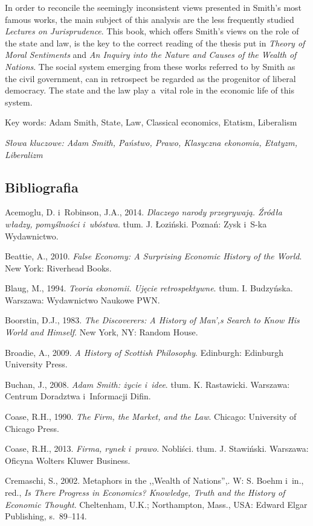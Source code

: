 In order to reconcile the seemingly inconsistent views presented in Smith's most famous works, the main subject of this analysis are the less frequently studied \textit{Lectures on Jurisprudence}. This book, which offers Smith's views on the role of the state and law, is the key to the correct reading of the thesis put in \textit{Theory of Moral Sentiments} and \textit{An Inquiry into the Nature and Causes of the Wealth of Nations}. The social system emerging from these works referred to by Smith as the civil government, can in retrospect be regarded as the progenitor of liberal democracy. The state and the law play a~vital role in the economic life of this system.

Key words: Adam Smith, State, Law, Classical economics, Etatism, Liberalism

{\itshape
Słowa kluczowe: Adam Smith, Państwo, Prawo, Klasyczna ekonomia, Etatyzm, Liberalizm}

\subsection{Bibliografia}

Acemoglu, D. i~Robinson, J.A., 2014. \textit{Dlaczego narody przegrywają. Źródła władzy, pomyślności i~ubóstwa}. tłum. J. Łoziński. Poznań: Zysk i~S-ka Wydawnictwo.

Beattie, A., 2010. \textit{False Economy: A Surprising Economic History of the World}. New York: Riverhead Books.

Blaug, M., 1994. \textit{Teoria ekonomii. Ujęcie retrospektywne}. tłum. I. Budzyńska. Warszawa: Wydawnictwo Naukowe PWN.

Boorstin, D.J., 1983. \textit{The Discoverers: A History of Man',s Search to Know His World and Himself}. New York, NY: Random House.

Broadie, A., 2009. \textit{A History of Scottish Philosophy}. Edinburgh: Edinburgh University Press.

Buchan, J., 2008. \textit{Adam Smith: życie i~idee}. tłum. K. Rastawicki. Warszawa: Centrum Doradztwa i~Informacji Difin.

Coase, R.H., 1990. \textit{The Firm, the Market, and the Law}. Chicago: University of Chicago Press.

Coase, R.H., 2013. \textit{Firma, rynek i~prawo}. Nobliści. tłum. J. Stawiński. Warszawa: Oficyna Wolters Kluwer Business.

Cremaschi, S., 2002. Metaphors in the ,,Wealth of Nations'',. W: S. Boehm i~in., red., \textit{Is There Progress in Economics? Knowledge, Truth and the History of Economic Thought}. Cheltenham, U.K.; Northampton, Mass., USA: Edward Elgar Publishing, s.~89–114.

